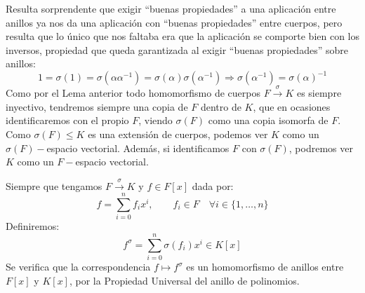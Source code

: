 \begin{observacion}
    Resulta sorprendente que exigir ``buenas propiedades'' a una aplicación entre anillos ya nos da una aplicación con ``buenas propiedades'' entre cuerpos, pero resulta que lo único que nos faltaba era que la aplicación se comporte bien con los inversos, propiedad que queda garantizada al exigir ``buenas propiedades'' sobre anillos:
    \begin{equation*}
        1 = \sigma(1) = \sigma\left(\alpha\alpha^{-1}\right) = \sigma(\alpha)\sigma\left(\alpha^{-1}\right) \Longrightarrow \sigma\left(\alpha^{-1}\right) = {\sigma(\alpha)}^{-1}
    \end{equation*}
    Como por el Lema anterior todo homomorfismo de cuerpos $F\stackrel{\sigma}{\to}K$ es siempre inyectivo, tendremos siempre una copia de $F$ dentro de $K$, que en ocasiones identificaremos con el propio $F$, viendo $\sigma(F)$ como una copia isomorfa de $F$. Como $\sigma(F)\leq K$ es una extensión de cuerpos, podemos ver $K$ como un $\sigma(F)-$espacio vectorial. Además, si identificamos $F$ con $\sigma(F)$, podremos ver $K$ como un $F-$espacio vectorial.
\end{observacion}

\begin{definicion}
    Siempre que tengamos $F\stackrel{\sigma}{\to} K$ y $f\in F[x]$ dada por:
\begin{equation*}
    f = \sum_{i=0}^{n} f_i x^i, \qquad f_i \in F \quad \forall i \in \{1,\ldots,n\}
\end{equation*}
Definiremos:
\begin{equation*}
    f^\sigma = \sum_{i=0}^{n} \sigma(f_i) x^i \in K[x]
\end{equation*}
Se verifica que la correspondencia $f\mapsto f^\sigma$ es un homomorfismo de anillos entre $F[x]$ y $K[x]$, por la Propiedad Universal del anillo de polinomios.
\end{definicion}

